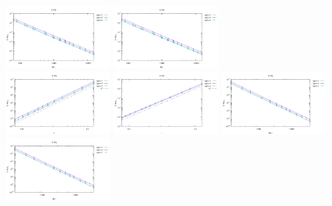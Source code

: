 \begin{center}
\includegraphics[width=4cm]{python_codes/fieldstone_120/results/Q2Q1-velocity-Nfem.pdf}
\includegraphics[width=4cm]{python_codes/fieldstone_120/results/Q2Q1-velocity-Nfem.pdf}
\\
\includegraphics[width=4cm]{python_codes/fieldstone_120/results/Q3Q2-velocity-h.pdf}
\includegraphics[width=4cm]{python_codes/fieldstone_120/results/Q3Q2-pressure-h.pdf}
\includegraphics[width=4cm]{python_codes/fieldstone_120/results/Q3Q2-velocity-Nfem.pdf}
\includegraphics[width=4cm]{python_codes/fieldstone_120/results/Q3Q2-velocity-Nfem.pdf}
\\
\end{center}







